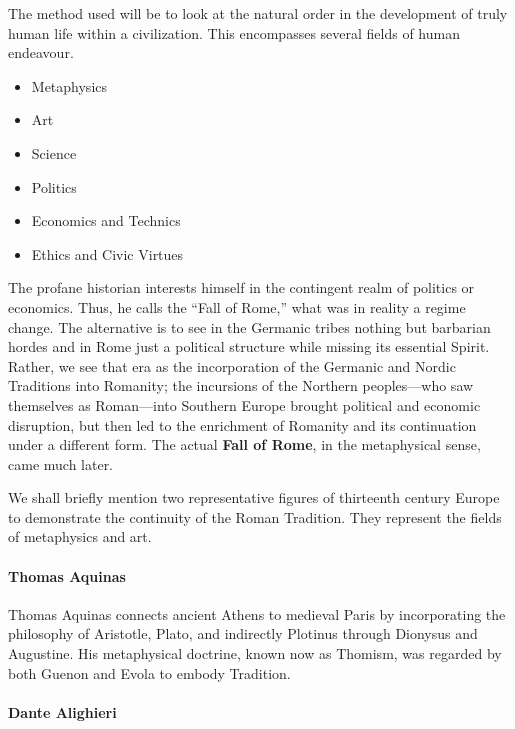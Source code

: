 The method used will be to look at the natural order in the development of truly human life within a civilization. This encompasses several fields of human endeavour.

\begin{itemize}


\item Metaphysics

\item Art

\item Science

\item Politics

\item Economics and Technics

\item Ethics and Civic Virtues
\end{itemize}


The profane historian interests himself in the contingent realm of politics or economics. Thus, he calls the ``Fall of Rome,'' what was in reality a regime change. The alternative is to see in the Germanic tribes nothing but barbarian hordes and in Rome just a political structure while missing its essential Spirit. Rather, we see that era as the incorporation of the Germanic and Nordic Traditions into Romanity; the incursions of the Northern peoples---who saw themselves as Roman---into Southern Europe brought political and economic disruption, but then led to the enrichment of Romanity and its continuation under a different form. The actual \textbf{Fall of Rome}, in the metaphysical sense, came much later.

We shall briefly mention two representative figures of thirteenth century Europe to demonstrate the continuity of the Roman Tradition. They represent the fields of metaphysics and art.

\paragraph{Thomas Aquinas}


Thomas Aquinas connects ancient Athens to medieval Paris by incorporating the philosophy of Aristotle, Plato, and indirectly Plotinus through Dionysus and Augustine. His metaphysical doctrine, known now as Thomism, was regarded by both Guenon and Evola to embody Tradition.

\paragraph{Dante Alighieri}


